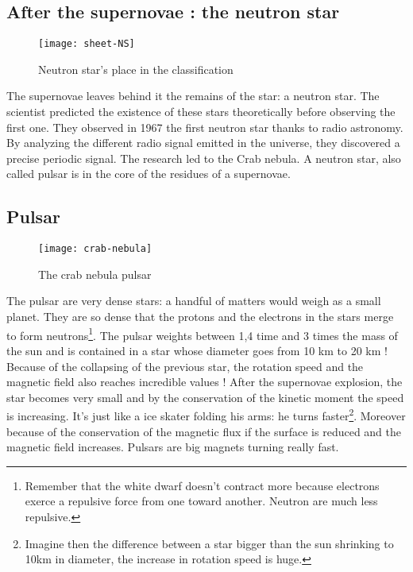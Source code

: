 \documentclass[a4paper, 11pt]{article} %
\begin{document}
\subsection{After the supernovae : the neutron star}

\begin{figure}[h]
\centering
\texttt{[image: sheet-NS]}
\caption{Neutron star's place in the classification}
\end{figure}
The supernovae leaves behind it the remains of the star: a neutron star. The scientist predicted the existence of these stars theoretically before observing the first one. They observed in 1967 the first neutron star thanks to radio astronomy. By analyzing the different radio signal emitted in the universe, they discovered a precise periodic signal. The research led to the Crab nebula. A neutron star, also called pulsar is in the core of the residues of a supernovae.

\subsection{Pulsar}

\begin{figure}[h]
\centering
\texttt{[image: crab-nebula]}
\caption{The crab nebula pulsar}
\end{figure}

 The pulsar are very dense stars: a handful of matters would weigh as a small planet. They are so dense that the protons and the electrons in the stars merge to form neutrons\footnote{Remember that the white dwarf doesn't contract more because electrons exerce a repulsive force from one toward another. Neutron are much less repulsive.}. The pulsar weights between 1,4 time and 3 times the mass of the sun and is contained in a star whose diameter goes from 10 km to 20 km ! Because of the collapsing of the previous star, the rotation speed and the magnetic field also reaches incredible values ! 
After the supernovae explosion, the star becomes very small and by the conservation of the kinetic moment the speed is increasing. It's just like a ice skater folding his arms: he turns faster\footnote{Imagine then the difference between a star bigger than the sun shrinking to 10km in diameter, the increase in rotation speed is huge.}. Moreover because of the conservation of the magnetic flux if the surface is reduced and the magnetic field increases. Pulsars are big magnets turning really fast.
\end{document}
